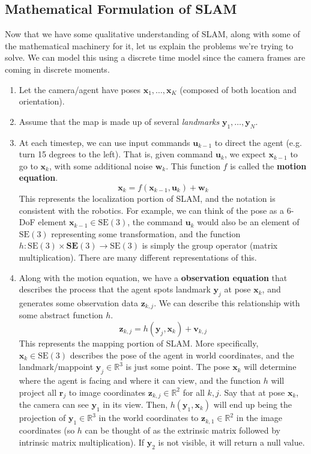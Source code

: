 \documentclass{article}
\theoremstyle{definition}
\theoremstyle{remark}
\theoremstyle{definition}
\begin{document}
\subsection{Mathematical Formulation of SLAM}

Now that we have some qualitative understanding of SLAM, along with some of the mathematical machinery for it, let us explain the problems we're trying to solve. We can model this using a discrete time model since the camera frames are coming in discrete moments. 
\begin{enumerate}
    \item Let the camera/agent have poses $\mathbf{x}_1, \ldots, \mathbf{x}_K$ (composed of both location and orientation). 
    \item Assume that the map is made up of several \textit{landmarks} $\mathbf{y}_1, \ldots, \mathbf{y}_N$. 
    \item At each timestep, we can use input commands $\mathbf{u}_{k-1}$ to direct the agent (e.g. turn 15 degrees to the left). That is, given command $\mathbf{u}_k$, we expect $\mathbf{x}_{k-1}$ to go to $\mathbf{x}_{k}$, with some additional noise $\mathbf{w}_k$. This function $f$ is called the \textbf{motion equation}. 
    \[\mathbf{x}_{k} = f(\mathbf{x}_{k-1}, \mathbf{u}_k) + \mathbf{w}_k\]
    This represents the localization portion of SLAM, and the notation is consistent with the robotics. For example, we can think of the pose as a 6-DoF element $\mathbf{x}_{k-1} \in \mathrm{SE}(3)$, the command $\mathbf{u}_k$ would also be an element of $\mathrm{SE}(3)$ representing some transformation, and the function $h: \mathrm{SE}(3) \times \mathbf{SE}(3) \longrightarrow \mathrm{SE}(3)$ is simply the group operator (matrix multiplication). There are many different representations of this. 
    
    \item Along with the motion equation, we have a \textbf{observation equation} that describes the process that the agent spots landmark $\mathbf{y}_j$ at pose $\mathbf{x}_k$, and generates some observation data $\mathbf{z}_{k, j}$. We can describe this relationship with some abstract function $h$. 
    \[\mathbf{z}_{k, j} = h (\mathbf{y}_j , \mathbf{x}_k) + \mathbf{v}_{k, j}\]
    This represents the mapping portion of SLAM. More specifically, $\mathbf{x}_k \in \mathrm{SE}(3)$ describes the pose of the agent in world coordinates, and the landmark/mappoint $\mathbf{y}_j \in \mathbb{R}^3$ is just some point. The pose $\mathbf{x}_k$ will determine where the agent is facing and where it can view, and the function $h$ will project all $\mathbf{r}_j$ to image coordinates $\mathbf{z}_{k, j} \in \mathbb{R}^2$ for all $k, j$. Say that at pose $\mathbf{x}_k$, the camera can see $\mathbf{y}_1$ in its view. Then, $h(\mathbf{y}_1, \mathbf{x}_k)$ will end up being the projection of $\mathbf{y}_1 \in \mathbb{R}^3$ in the world coordinates to $\mathbf{z}_{k, 1} \in \mathbb{R}^2$ in the image coordinates (so $h$ can be thought of as the extrinsic matrix followed by intrinsic matrix multiplication). If $\mathbf{y}_2$ is not visible, it will return a null value. 
\end{enumerate}
\end{document}
